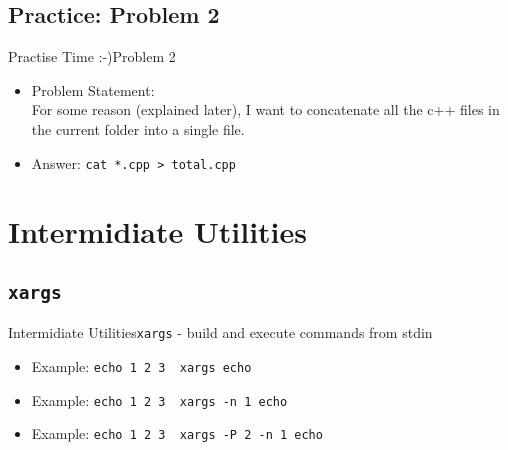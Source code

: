 \documentclass[aspectratio=169]{beamer}
\begin{document}
\subsection{Practice: Problem 2}
\begin{frame}{Practise Time :-)}{Problem 2}

\begin{itemize}[<+->]
\item
  Problem Statement:\\
  For some reason (explained later), I want to concatenate all the c++
  files in the current folder into a single file.
\item
  Answer: \texttt{cat\ *.cpp\ \textgreater{}\ total.cpp}
\end{itemize}

\end{frame}

\section{Intermidiate Utilities}\label{Intermidiate-tools}

\subsection{\tt xargs}
\begin{frame}{Intermidiate Utilities}{\texttt{xargs} - build and execute commands from stdin}

\begin{itemize}[<+->]
\item
  Example: \texttt{echo\ 1\ 2\ 3\ \textbar{}\ xargs\ echo}
\item
  Example: \texttt{echo\ 1\ 2\ 3\ \textbar{}\ xargs\ -n\ 1\ echo}
\item
  Example: \texttt{echo\ 1\ 2\ 3\ \textbar{}\ xargs\ -P\ 2\ -n\ 1\ echo}
\end{itemize}

\end{frame}

\end{document}
